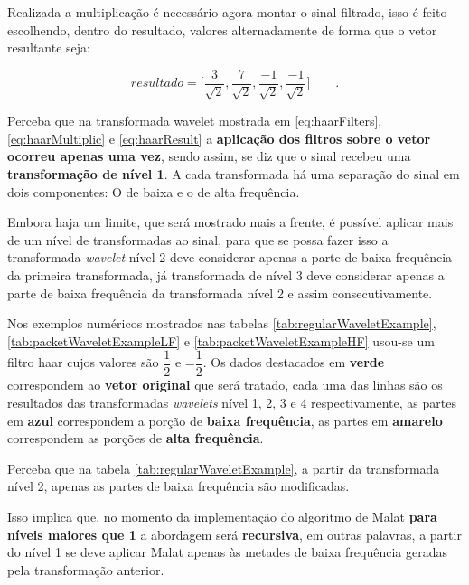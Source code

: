 			\par Realizada a multiplicação é necessário agora montar o sinal filtrado, isso é feito escolhendo, dentro do resultado, valores alternadamente de forma que o vetor resultante seja:

			\begin{equation}
				resultado = \Big[
				\frac{3}{\sqrt{2}},
				\frac{7}{\sqrt{2}},
				\frac{-1}{\sqrt{2}},
				\frac{-1}{\sqrt{2}}
				\Big]\qquad.
				\label{eq:haarResult}
			\end{equation}
			
			\par Perceba que na transformada wavelet mostrada em \ref{eq:haarFilters}, \ref{eq:haarMultiplic} e \ref{eq:haarResult} a \textbf{aplicação dos filtros sobre  o vetor ocorreu apenas uma vez}, sendo assim, se diz que o sinal recebeu uma \textbf{transformação de nível 1}. A cada transformada há uma separação do sinal em dois componentes: O de baixa e o de alta frequência.
			
			\par Embora haja um limite, que será mostrado mais a frente, é possível aplicar mais de um nível de transformadas ao sinal, para que se possa fazer isso a transformada \textit{wavelet} nível 2 deve considerar apenas a parte de baixa frequência da primeira transformada, já transformada de nível 3 deve considerar apenas a parte de baixa frequência da transformada nível 2 e assim consecutivamente.
			
			\par Nos exemplos numéricos mostrados nas tabelas \ref{tab:regularWaveletExample}, \ref{tab:packetWaveletExampleLF} e \ref{tab:packetWaveletExampleHF} usou-se um filtro haar cujos valores são $\dfrac{1}{2}$ e $-\dfrac{1}{2}$. Os dados destacados em \textbf{verde} correspondem ao \textbf{vetor original} que será tratado, cada uma das linhas são os resultados das transformadas \textit{wavelets} nível 1, 2, 3 e 4 respectivamente, as partes em \textbf{azul} correspondem a porção de \textbf{baixa frequência}, as partes em \textbf{amarelo} correspondem as porções de \textbf{alta frequência}.
			
			\par Perceba que na tabela \ref{tab:regularWaveletExample}, a partir da transformada nível 2, apenas as partes de baixa frequência são modificadas.
			
			\par Isso implica que, no momento da implementação do algoritmo de Malat \textbf{para níveis maiores que 1} a abordagem será \textbf{recursiva}, em outras palavras, a partir do nível 1 se deve aplicar Malat apenas às metades de baixa frequência geradas pela transformação anterior.
			

